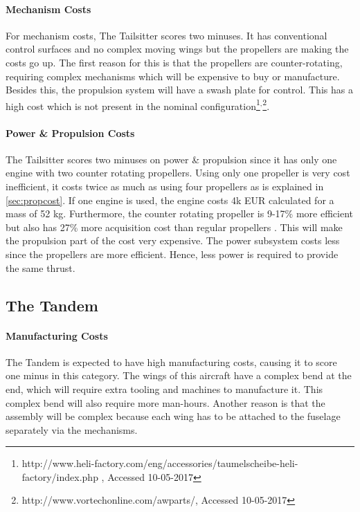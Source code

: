 \paragraph{Mechanism Costs}

For mechanism costs, The Tailsitter scores two minuses. It has conventional control surfaces and no complex moving wings but the propellers are making the costs go up. The first reason for this is that the propellers are counter-rotating, requiring complex mechanisms which will be expensive to buy or manufacture. Besides this, the propulsion system will have a swash plate for control. This has a high cost which is not present in the nominal configuration\footnote{http://www.heli-factory.com/eng/accessories/taumelscheibe-heli-factory/index.php , Accessed 10-05-2017}$^,$\footnote{http://www.vortechonline.com/awparts/, Accessed 10-05-2017}.

\paragraph{Power \& Propulsion Costs}
The Tailsitter scores two minuses on power \& propulsion since it has only one engine with two counter rotating propellers. Using only one propeller is very cost inefficient, it costs twice as much as using four propellers as is explained in \autoref{sec:propcost}. If one engine is used, the engine costs 4k EUR calculated for a mass of 52 kg. Furthermore, the counter rotating propeller is 9-17\% more efficient but also has 27\% more acquisition cost than regular propellers \cite{vanderover}. This will make the propulsion part of the cost very expensive. The power subsystem costs less since the propellers are more efficient. Hence, less power is required to provide the same thrust.

\subsection{The Tandem}

\paragraph{Manufacturing Costs} The Tandem is expected to have high manufacturing costs, causing it to score one minus in this category. The wings of this aircraft have a complex bend at the end, which will require extra tooling and machines to manufacture it. This complex bend will also require more man-hours. Another reason is that the assembly will be complex because each wing has to be attached to the fuselage separately via the mechanisms.

